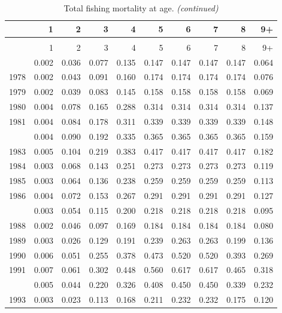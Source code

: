 \documentclass[
]{article}
\begin{document}
\begin{longtable}[t]{lrrrrrrrrr}
\caption{\label{tab:FAA-tot-table}Total fishing mortality at age.}\\
\toprule
  & 1 & 2 & 3 & 4 & 5 & 6 & 7 & 8 & 9+\\
\midrule
\endfirsthead
\caption[]{Total fishing mortality at age. \textit{(continued)}}\\
\toprule
  & 1 & 2 & 3 & 4 & 5 & 6 & 7 & 8 & 9+\\
\midrule
\endhead

\endfoot
\bottomrule
\endlastfoot
1977 & 0.002 & 0.036 & 0.077 & 0.135 & 0.147 & 0.147 & 0.147 & 0.147 & 0.064\\
1978 & 0.002 & 0.043 & 0.091 & 0.160 & 0.174 & 0.174 & 0.174 & 0.174 & 0.076\\
1979 & 0.002 & 0.039 & 0.083 & 0.145 & 0.158 & 0.158 & 0.158 & 0.158 & 0.069\\
1980 & 0.004 & 0.078 & 0.165 & 0.288 & 0.314 & 0.314 & 0.314 & 0.314 & 0.137\\
1981 & 0.004 & 0.084 & 0.178 & 0.311 & 0.339 & 0.339 & 0.339 & 0.339 & 0.148\\
\addlinespace
1982 & 0.004 & 0.090 & 0.192 & 0.335 & 0.365 & 0.365 & 0.365 & 0.365 & 0.159\\
1983 & 0.005 & 0.104 & 0.219 & 0.383 & 0.417 & 0.417 & 0.417 & 0.417 & 0.182\\
1984 & 0.003 & 0.068 & 0.143 & 0.251 & 0.273 & 0.273 & 0.273 & 0.273 & 0.119\\
1985 & 0.003 & 0.064 & 0.136 & 0.238 & 0.259 & 0.259 & 0.259 & 0.259 & 0.113\\
1986 & 0.004 & 0.072 & 0.153 & 0.267 & 0.291 & 0.291 & 0.291 & 0.291 & 0.127\\
\addlinespace
1987 & 0.003 & 0.054 & 0.115 & 0.200 & 0.218 & 0.218 & 0.218 & 0.218 & 0.095\\
1988 & 0.002 & 0.046 & 0.097 & 0.169 & 0.184 & 0.184 & 0.184 & 0.184 & 0.080\\
1989 & 0.003 & 0.026 & 0.129 & 0.191 & 0.239 & 0.263 & 0.263 & 0.199 & 0.136\\
1990 & 0.006 & 0.051 & 0.255 & 0.378 & 0.473 & 0.520 & 0.520 & 0.393 & 0.269\\
1991 & 0.007 & 0.061 & 0.302 & 0.448 & 0.560 & 0.617 & 0.617 & 0.465 & 0.318\\
\addlinespace
1992 & 0.005 & 0.044 & 0.220 & 0.326 & 0.408 & 0.450 & 0.450 & 0.339 & 0.232\\
1993 & 0.003 & 0.023 & 0.113 & 0.168 & 0.211 & 0.232 & 0.232 & 0.175 & 0.120\\

\end{longtable}
\end{document}

